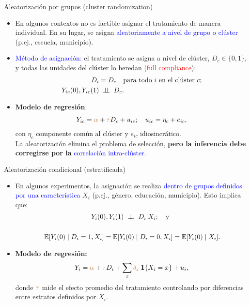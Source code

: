 \documentclass[10pt, xcolor=dvipsnames]{beamer}
\begin{document}
\begin{frame}{Aleatorización por grupos (cluster randomization)}
\begin{itemize}	
    \item En algunos contextos no es factible asignar el tratamiento de manera individual.  
    En su lugar, se asigna \textcolor{blue}{aleatoriamente a nivel de grupo o clúster} (p.ej., escuela, municipio).
    \vspace{0.4em}
    \item \textcolor{blue}{Método de asignación:} el tratamiento se asigna a nivel de clúster, $D_c \in \{0,1\}$, y todas las unidades del clúster lo heredan (\textcolor{red}{full compliance}):
    \vspace{-0.5em}
    \begin{align*}
        D_i &= D_c \quad \text{para todo $i$ en el clúster $c$}; \\
        Y_{ic}(0),Y_{ic}(1) &\;\perp \!\!\! \perp\; D_c.
    \end{align*}
    \vspace{-2em}
    \item \textbf{Modelo de regresión}:
    \vspace{-1em}
    \[
        Y_{ic} = \textcolor{brown}{\alpha} + \textcolor{brown}{\tau} D_c + u_{ic}; 
        \quad u_{ic} = \eta_c + e_{ic},
    \]
    con $\eta_c$ componente común al clúster y $e_{ic}$ idiosincrático. \\
    \vspace{0.3em}
    La aleatorización elimina el problema de selección, \textbf{pero la inferencia debe corregirse por la} \textcolor{blue}{correlación intra-clúster}.
\end{itemize}
\end{frame}


\begin{frame}{Aleatorización condicional (estratificada)}
\begin{itemize}	
    \item En algunos experimentos, la asignación se realiza \textcolor{blue}{dentro de grupos definidos por una característica} $X_i$ (p.ej., género, educación, municipio). Esto implica que:  
    \vspace{-0.5em}
    \begin{align*}
        &\hspace{2.5cm} Y_i(0),Y_i(1) \;\perp \!\!\! \perp\; D_i | X_i; \quad \text{y} \\ \\
        &\operatorname{\mathbb{E}}[Y_i(0)\mid D_i=1,X_i] = \operatorname{\mathbb{E}}[Y_i(0)\mid D_i=0,X_i] = \operatorname{\mathbb{E}}[Y_i(0)\mid X_i].
    \end{align*}
    \item \textbf{Modelo de regresión:} 
    \vspace{-0.0em}
    \begin{align*}
        Y_i = \textcolor{brown}{\alpha} + \textcolor{brown}{\tau} D_i + \sum_{x} \textcolor{brown}{\delta_x} \,\mathbf{1}\{X_i=x\} + u_i,
    \end{align*}
    donde $\textcolor{brown}{\tau}$ mide el efecto promedio del tratamiento controlando por diferencias entre estratos definidos por $X_i$.
\end{itemize}
\end{frame}
\end{document}
